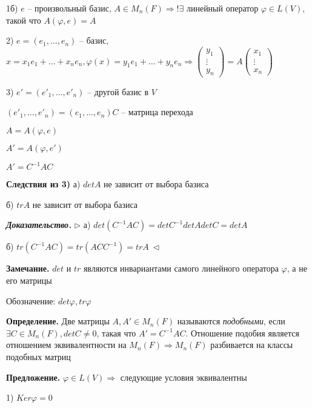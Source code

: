 1б) $e$ -- произвольный базис, $A \in M_n(F) \Rightarrow ! \exists$ линейный оператор $\varphi \in L(V)$, такой что $A(\varphi, e) = A$

2) $e = (e_1, \dots, e_n)$ -- базис, $x = x_1 e_1 + \dots + x_n e_n, \varphi (x) = y_1 e_1 + \dots + y_n e_n \Rightarrow \begin{pmatrix} y_1 \\ \vdots \\ y_n \end{pmatrix} = A \begin{pmatrix} x_1 \\ \vdots \\ x_n
\end{pmatrix}$

3) $e' = (e'_1, \dots, e'_n)$ -- другой базис в $V$

$(e'_1, \dots, e'_n) = (e_1, \dots, e_n) C$ -- матрица перехода

$A = A(\varphi, e)$

$A' = A(\varphi, e')$

$A' = C^{-1}AC$

\vspace{\baselineskip}
\textbf{Следствия из 3)} а) $det A$ не зависит от выбора базиса

б) $tr A$ не зависит от выбора базиса

\vspace{\baselineskip}
\textbf{\textit{Доказательство.}} $\rhd$ а) $det (C^{-1} A C) = det C^{-1} det A det C = det A$

б) $tr(C^{-1} AC) = tr (AC C^{-1}) = tr A \ \lhd$

\vspace{\baselineskip}
\textbf{Замечание.} $det$ и $tr$ являются инвариантами самого линейного оператора $\varphi$, а не его матрицы

Обозначение: $det \varphi, tr \varphi$

\vspace{\baselineskip}
\textbf{Определение.} Две матрицы $A, A' \in M_n(F)$ называются \textit{подобными}, если $\exists C \in M_n(F), detC \neq 0$, такая что $A' = C^{-1} A C$. Отношение подобия является отношением эквивалентности на $M_n(F) \Rightarrow M_n(F)$ разбивается на классы подобных матриц

\vspace{\baselineskip}
\textbf{Предложение.} $\varphi \in L(V) \Rightarrow$ следующие условия эквивалентны

1) $Ker \varphi = {0}$

